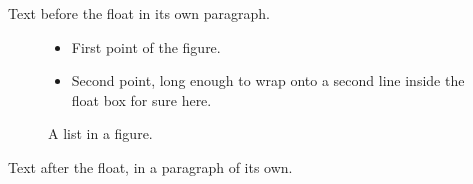 \documentclass[10pt]{article}
\begin{document}
Text before the float in its own paragraph.

\begin{figure}[h]
\begin{itemize}
\item First point of the figure.
\item Second point, long enough to wrap onto a second line inside the float box for sure here.
\end{itemize}
\caption{A list in a figure.}
\end{figure}

Text after the float, in a paragraph of its own.
\end{document}
